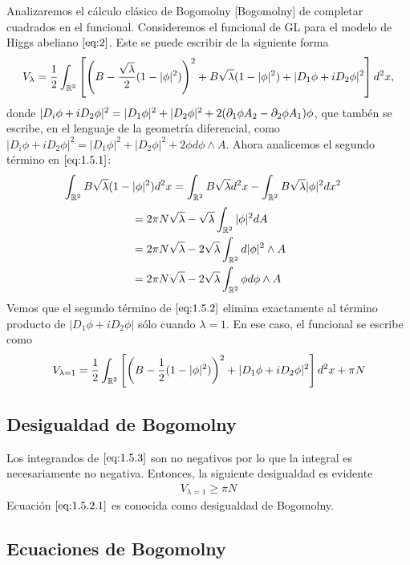 Analizaremos el cálculo clásico de Bogomolny [Bogomolny] de completar cuadrados en el funcional. Consideremos el funcional de GL para el modelo de Higgs abeliano $\eqref{eq:2}$. Este se puede escribir de la siguiente forma
\begin{align}
    V_\lambda = \frac{1}{2}\int_{\mathbb{R}^2}\left[\left(B-\frac{\sqrt\lambda}{2}(1-|\phi|^2)\right)^2+B\sqrt\lambda(1-|\phi|^2)+|D_1\phi+iD_2\phi|^2\right]d^2x, \label{eq:1.5.1}
\end{align}
donde $|D_i\phi+iD_2\phi|^2=|D_1\phi|^2+|D_2\phi|^2+2(\partial_1\phi A_2-\partial_2\phi A_1)\phi$, que tambén se escribe, en el lenguaje de la geometría diferencial, como $|D_i\phi+iD_2\phi|^2=|D_1\phi|^2+|D_2\phi|^2+2\phi d\phi\wedge A$. Ahora analicemos el segundo término en $\eqref{eq:1.5.1}$:
\begin{align}
    \nonumber
    \int_{\mathbb{R}^2} B\sqrt{\lambda}(1-|\phi|^2) d^2x &= \int_{\mathbb{R}^2} B\sqrt{\lambda} d^2x-\int_{\mathbb{R}^2}B\sqrt{\lambda}|\phi|^2 dx^2
\end{align}
\begin{align}
    \nonumber
    &= 2\pi N\sqrt{\lambda}-\sqrt{\lambda}\int_{\mathbb{R}^2} |\phi|^2 dA \\ \nonumber
    &= 2\pi N\sqrt\lambda-2\sqrt{\lambda}\int_{\mathbb{R}^2} d|\phi|^2\wedge A\\
    &= 2\pi N\sqrt\lambda-2\sqrt{\lambda}\int_{\mathbb{R}^2} \phi d\phi\wedge A \label{eq:1.5.2}
\end{align}
 Vemos que el segundo término de $\eqref{eq:1.5.2}$ elimina exactamente al término producto de $|D_1\phi+iD_2\phi|$ sólo cuando $\lambda=1$. En ese caso, el funcional se escribe como
 \begin{align}
     V_{\lambda=1} = \frac{1}{2}\int_{\mathbb{R}^2}\left[\left(B-\frac{1}{2}(1-|\phi|^2)\right)^2+|D_1\phi+iD_2\phi|^2\right]d^2x+ \pi N \label{eq:1.5.3}
 \end{align}
 
 \subsection{Desigualdad de Bogomolny}
 
 Los integrandos de $\eqref{eq:1.5.3}$ son no negativos por lo que la integral es necesariamente no negativa. Entonces, la siguiente desigualdad es evidente
 \begin{align}
     V_{\lambda=1}\geq \pi N\label{eq:1.5.2.1}
 \end{align}
 Ecuación $\eqref{eq:1.5.2.1}$ es conocida como desigualdad de Bogomolny.
 
 \subsection{Ecuaciones de Bogomolny}
 
